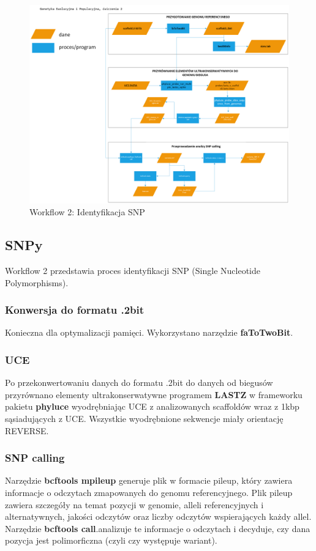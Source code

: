 \documentclass[a4paper, 12pt]{article}
\begin{document}
\begin{figure}[H]
    \centering
    \includegraphics[width=\textwidth]{img/workflow2.png}
    \caption{Workflow 2: Identyfikacja SNP}
    \label{fig:workflow2}
\end{figure}
\subsection{SNPy}
Workflow 2 przedstawia proces identyfikacji SNP (Single Nucleotide Polymorphisms).
\subsubsection{Konwersja do formatu .2bit}
Konieczna dla optymalizacji pamięci. Wykorzystano narzędzie \textbf{faToTwoBit}.
\subsubsection{UCE}
Po przekonwertowaniu danych do formatu .2bit do danych od biegusów przyrównano elementy ultrakonserwatywne programem \textbf{LASTZ} w frameworku pakietu \textbf{phyluce} wyodrębniając UCE z analizowanych scaffoldów wraz z 1kbp sąsiadujących z UCE. Wszystkie wyodrębnione sekwencje miały orientację REVERSE.
\subsubsection{SNP calling}
 Narzędzie \textbf{bcftools mpileup} generuje plik w formacie pileup, który zawiera informacje o odczytach zmapowanych do genomu referencyjnego. Plik pileup zawiera szczegóły na temat pozycji w genomie, alleli referencyjnych i alternatywnych, jakości odczytów oraz liczby odczytów wspierających każdy allel. Narzędzie \textbf{bcftools call}.analizuje te informacje o odczytach i decyduje, czy dana pozycja jest polimorficzna (czyli czy występuje wariant).
\end{document}
